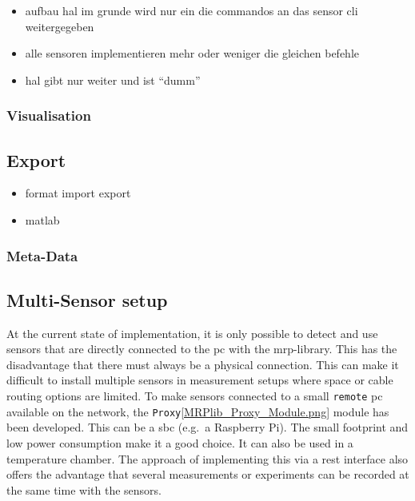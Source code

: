 \begin{itemize}
\tightlist
\item
  aufbau hal im grunde wird nur ein die commandos an das sensor cli
  weitergegeben
\item
  alle sensoren implementieren mehr oder weniger die gleichen befehle
\item
  hal gibt nur weiter und ist ``dumm''
\end{itemize}

\hypertarget{visualisation}{%
\subsubsection{Visualisation}\label{visualisation}}

\hypertarget{export}{%
\subsection{Export}\label{export}}

\begin{itemize}
\tightlist
\item
  format import export
\item
  matlab
\end{itemize}

\hypertarget{meta-data}{%
\subsubsection{Meta-Data}\label{meta-data}}

\hypertarget{multi-sensor-setup}{%
\subsection{Multi-Sensor setup}\label{multi-sensor-setup}}

At the current state of implementation, it is only possible to detect
and use sensors that are directly connected to the \gls{pc} with the
\gls{mrp}-library. This has the disadvantage that there must always be a
physical connection. This can make it difficult to install multiple
sensors in measurement setups where space or cable routing options are
limited. To make sensors connected to a small
\passthrough{\lstinline!remote!} \gls{pc} available on the network, the
\passthrough{\lstinline!Proxy!}\ref{MRPlib_Proxy_Module.png} module has
been developed. This can be a \gls{sbc} (e.g.~a Raspberry Pi). The small
footprint and low power consumption make it a good choice. It can also
be used in a temperature chamber. The approach of implementing this via
a \gls{rest} interface also offers the advantage that several
measurements or experiments can be recorded at the same time with the
sensors.

